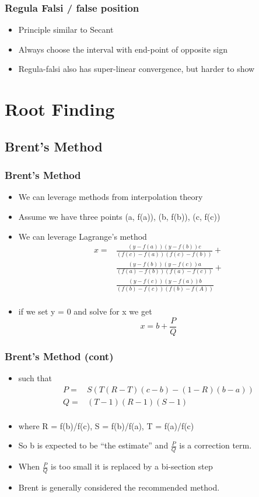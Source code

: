 \documentclass[10pt]{beamer}
\begin{document}
\begin{frame}
  \frametitle{Regula Falsi / false position}
  \begin{itemize}
  \item Principle similar to Secant
  \item Always choose the interval with end-point of opposite sign
  \item Regula-falsi also has super-linear convergence, but harder to show
  \end{itemize}
\end{frame}

\section{Root Finding}

\subsection{Brent's Method}

\begin{frame}
  \frametitle{Brent's Method}
  \begin{itemize}
  \item We can leverage methods from interpolation theory
  \item Assume we have three points  (a, f(a)), (b, f(b)), (c, f(c))
  \item We can leverage Lagrange's method
    \[
      \begin{array}{cc}
      x = &  \frac{(y-f(a))(y-f(b)) c}{(f(c)-f(a))(f(c)-f(b))} +\\
          &  \frac{(y-f(b))(y-f(c)) a}{(f(a)-f(b))(f(a)-f(c))} +\\
          &  \frac{(y-f(c))(y-f(a)) b}{(f(b)-f(c))(f(b)-f(A))}\\
      \end{array}
    \]
  \item if we set y = 0 and solve for x we get
    \[
      x = b + \frac{P}{Q}
    \]
  \end{itemize}
\end{frame}

\begin{frame}
  \frametitle{Brent's Method (cont)}
  \begin{itemize}
  \item such that
    \[
      \begin{array}{cc}
        P = &  S(T(R-T)(c-b) - (1-R)(b-a))\\
        Q = & (T-1)(R-1)(S-1)\\
      \end{array}
    \]
  \item where R = f(b)/f(c), S = f(b)/f(a), T = f(a)/f(c)
  \item So b is expected to be ``the estimate'' and $\frac{P}{Q}$ is a correction term.
  \item When $\frac{P}{Q}$ is too small it is replaced by a bi-section step
  \item Brent is generally considered the recommended method. 
  \end{itemize}
\end{frame}
\end{document}
